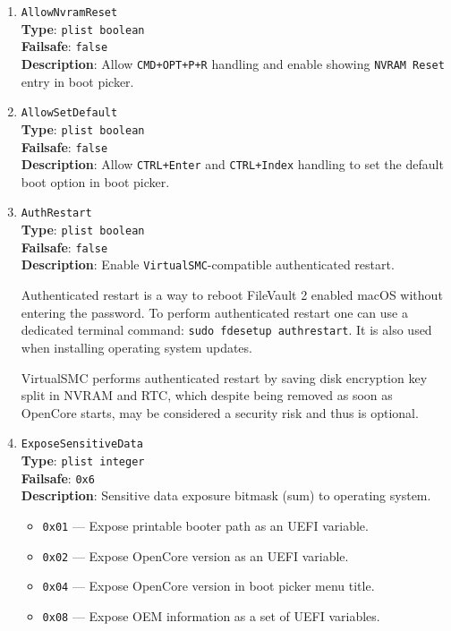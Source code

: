 \documentclass[]{article}
\providecommand{\tightlist}{%
  \setlength{\itemsep}{0pt}\setlength{\parskip}{0pt}}
\begin{document}
\begin{enumerate}

\item
  \texttt{AllowNvramReset}\\
  \textbf{Type}: \texttt{plist\ boolean}\\
  \textbf{Failsafe}: \texttt{false}\\
  \textbf{Description}: Allow \texttt{CMD+OPT+P+R} handling and enable
  showing \texttt{NVRAM Reset} entry in boot picker.

\item
  \texttt{AllowSetDefault}\\
  \textbf{Type}: \texttt{plist\ boolean}\\
  \textbf{Failsafe}: \texttt{false}\\
  \textbf{Description}: Allow \texttt{CTRL+Enter} and \texttt{CTRL+Index} handling
  to set the default boot option in boot picker.

\item
  \texttt{AuthRestart}\\
  \textbf{Type}: \texttt{plist\ boolean}\\
  \textbf{Failsafe}: \texttt{false}\\
  \textbf{Description}: Enable \texttt{VirtualSMC}-compatible authenticated restart.

  Authenticated restart is a way to reboot FileVault 2 enabled macOS without entering
  the password. To perform authenticated restart one can use a dedicated terminal
  command: \texttt{sudo fdesetup authrestart}. It is also used when installing
  operating system updates.

  VirtualSMC performs authenticated restart by saving disk encryption key split in
  NVRAM and RTC, which despite being removed as soon as OpenCore starts, may be
  considered a security risk and thus is optional.

\item
  \texttt{ExposeSensitiveData}\\
  \textbf{Type}: \texttt{plist\ integer}\\
  \textbf{Failsafe}: \texttt{0x6}\\
  \textbf{Description}: Sensitive data exposure bitmask (sum) to operating system.

  \begin{itemize}
  \tightlist
    \item \texttt{0x01} --- Expose printable booter path as an UEFI variable.
    \item \texttt{0x02} --- Expose OpenCore version as an UEFI variable.
    \item \texttt{0x04} --- Expose OpenCore version in boot picker menu title.
    \item \texttt{0x08} --- Expose OEM information as a set of UEFI variables.
  \end{itemize}


\end{enumerate}
\end{document}
